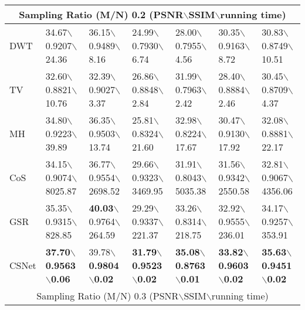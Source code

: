 \documentclass[5pt]{article}
\begin{document}
\begin{table*}[t]
\begin{tabular}{|l|l|l|l|l|l|l|}
\hline 
\multicolumn{7}{|c|}{Sampling Ratio (M/N) 0.2 (PSNR$\backslash$SSIM$\backslash$running time)}\\
\hline 
DWT & 34.67$\backslash$0.9207$\backslash$24.36 & 36.15$\backslash$0.9489$\backslash$8.16 & 24.99$\backslash$0.7930$\backslash$6.74 & 28.00$\backslash$0.7955$\backslash$4.56 & 30.35$\backslash$0.9163$\backslash$8.72 & 30.83$\backslash$0.8749$\backslash$10.51\\ 
\hline 
TV & 32.60$\backslash$0.8821$\backslash$10.76 & 32.39$\backslash$0.9027$\backslash$3.37 & 26.86$\backslash$0.8848$\backslash$2.84 & 31.99$\backslash$0.7963$\backslash$2.42 & 28.40$\backslash$0.8884$\backslash$2.46 & 30.45$\backslash$0.8709$\backslash$4.37\\ 
\hline 
MH & 34.80$\backslash$0.9223$\backslash$39.89 & 36.35$\backslash$0.9503$\backslash$13.74 & 25.81$\backslash$0.8324$\backslash$21.60 & 32.98$\backslash$0.8224$\backslash$17.67 & 30.47$\backslash$0.9130$\backslash$17.92 & 32.08$\backslash$0.8881$\backslash$22.17\\ 
\hline 
CoS & 34.15$\backslash$0.9074$\backslash$\tiny 8025.87 & 36.77$\backslash$0.9554$\backslash$\tiny 2698.52 & 29.66$\backslash$0.9323$\backslash$\tiny 3469.95 & 31.91$\backslash$0.8043$\backslash$\tiny 5035.38 & 31.56$\backslash$0.9342$\backslash$\tiny 2550.58 & 32.81$\backslash$0.9067$\backslash$\tiny 4356.06\\ 
\hline 
GSR & 35.35$\backslash$0.9315$\backslash$828.85 & \textbf{40.03}$\backslash$0.9764$\backslash$264.59 & 29.29$\backslash$0.9337$\backslash$221.37 & 33.26$\backslash$0.8314$\backslash$218.75 & 32.92$\backslash$0.9555$\backslash$236.01 & 34.17$\backslash$0.9257$\backslash$353.91\\ 
\hline 
CSNet & \textbf{37.70}$\backslash$\textbf{0.9563}$\backslash$\textbf{0.06} & 39.78$\backslash$\textbf{0.9804}$\backslash$\textbf{0.02} & \textbf{31.79}$\backslash$\textbf{0.9523}$\backslash$\textbf{0.02} & \textbf{35.08}$\backslash$\textbf{0.8763}$\backslash$\textbf{0.01} & \textbf{33.82}$\backslash$\textbf{0.9603}$\backslash$\textbf{0.02} & \textbf{35.63}$\backslash$\textbf{0.9451}$\backslash$\textbf{0.02}\\ 
\hline 
\multicolumn{7}{|c|}{Sampling Ratio (M/N) 0.3 (PSNR$\backslash$SSIM$\backslash$running time)}\\
\hline 

\end{tabular}
\end{table*}
\end{document}
